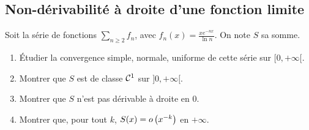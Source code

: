 \subsection{Non-dérivabilité à droite d'une fonction limite}

Soit la série de fonctions $\sum\limits_{n\geqslant 2}f_n$, avec $f_n(x)=\frac{xe^{-nx}}{\ln n}$. On note $S$ sa somme.
\begin{enumerate}
    \item Étudier la convergence simple, normale, uniforme de cette série sur $[0,+\infty[$.
    \item Montrer que $S$ est de classe $\mathcal{C}^1$ sur $]0,+\infty[$.
    \item Montrer que $S$ n'est pas dérivable à droite en 0.
    \item Montrer que, pour tout $k$, $S(x)=o\left(x^{-k}\right)$ en $+\infty$.
\end{enumerate}


